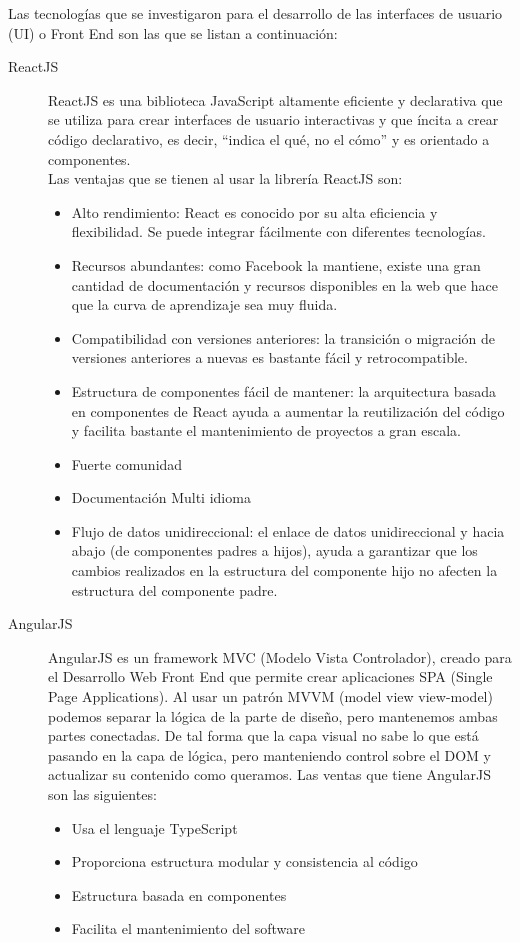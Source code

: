     Las tecnologías que se investigaron para el desarrollo de las interfaces de usuario (UI) o Front End son las que se listan a continuación:
    \begin{description}
        \item[ReactJS] ReactJS es una biblioteca JavaScript altamente eficiente y declarativa que se utiliza para crear interfaces de usuario interactivas y que íncita a crear código declarativo, es decir, “indica el qué, no el cómo” y es orientado a componentes. \cite{sa}\\
        Las ventajas que se tienen al usar la librería ReactJS son:
        \begin{itemize}
            \item Alto rendimiento: React es conocido por su alta eficiencia y flexibilidad. Se puede integrar fácilmente con diferentes tecnologías.
            \item Recursos abundantes: como Facebook la mantiene, existe una gran cantidad de documentación y recursos disponibles en la web que hace que la curva de aprendizaje sea muy fluida.
            \item Compatibilidad con versiones anteriores: la transición o migración de versiones anteriores a nuevas es bastante fácil y retrocompatible.
            \item Estructura de componentes fácil de mantener: la arquitectura basada en componentes de React ayuda a aumentar la reutilización del código y facilita bastante el mantenimiento de proyectos a gran escala.
            \item Fuerte comunidad
            \item Documentación Multi idioma
            \item Flujo de datos unidireccional: el enlace de datos unidireccional y hacia abajo (de componentes padres a hijos), ayuda a garantizar que los cambios realizados en la estructura del componente hijo no afecten la estructura del componente padre.
            
        \end{itemize}

        \item[AngularJS] AngularJS es un framework MVC (Modelo Vista Controlador), creado para el Desarrollo Web Front End que permite crear aplicaciones SPA (Single Page Applications).
        Al usar un patrón MVVM (model view view-model) podemos separar la lógica de la parte de diseño, pero mantenemos ambas partes conectadas. De tal forma que la capa visual no sabe lo que está pasando en la capa de lógica, pero manteniendo control sobre el DOM y actualizar su contenido como queramos.
        Las ventas que tiene AngularJS son las siguientes:
        \begin{itemize}
            \item Usa el lenguaje TypeScript
            \item Proporciona estructura modular y consistencia al código
            \item Estructura basada en componentes
            \item Facilita el mantenimiento del software
        \end{itemize}


\end{description}
